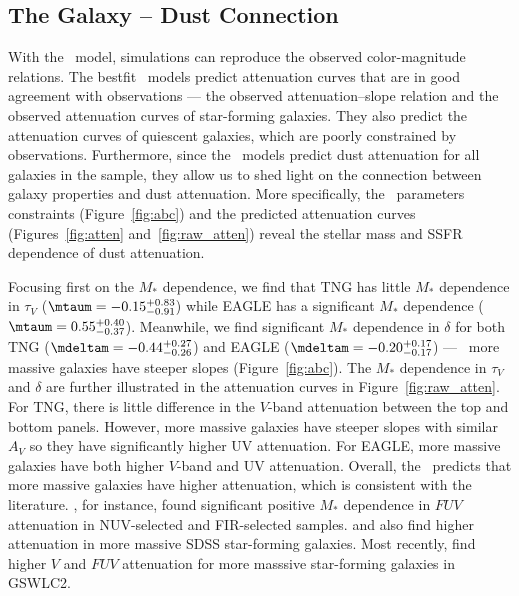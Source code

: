 \subsection{The Galaxy -- Dust Connection}  
With the \eda~model, simulations can reproduce the observed color-magnitude
relations. The bestfit \eda~models predict attenuation curves that are
in good agreement with observations --- the observed attenuation--slope
relation and the observed attenuation curves of star-forming galaxies. They
also predict the attenuation curves of quiescent galaxies, which are poorly
constrained by observations. Furthermore, since the \eda~models predict dust
attenuation for all galaxies in the sample, they allow us to shed light on the
connection between galaxy properties and dust attenuation.  More specifically, 
the \eda~parameters constraints (Figure~\ref{fig:abc}) and the predicted
attenuation curves (Figures~\ref{fig:atten} and~\ref{fig:raw_atten}) reveal the
stellar mass and SSFR dependence of dust attenuation. 

Focusing first on the $M_*$ dependence, we find that TNG has little $M_*$
dependence in $\tau_V$ ($\mtaum = -0.15\substack{+0.83 \\ -0.91}$) while EAGLE
has a significant $M_*$ dependence ($\mtaum = 0.55\substack{+0.40 \\ -0.37}$).
Meanwhile, we find significant $M_*$ dependence in $\delta$ for both TNG 
($\mdeltam = -0.44\substack{+0.27\\-0.26}$) and EAGLE ($\mdeltam =
-0.20\substack{+0.17\\-0.17}$) --- \ie~more massive galaxies have steeper
slopes (Figure~\ref{fig:abc}). The $M_*$ dependence in $\tau_V$ and $\delta$
are further illustrated in the attenuation curves in Figure~\ref{fig:raw_atten}.
For TNG, there is little difference in the $V$-band attenuation between the 
top and bottom panels. However, more massive galaxies have steeper slopes 
with similar $A_V$ so they have significantly higher UV attenuation. For
EAGLE, more massive galaxies have both higher $V$-band and UV attenuation.
Overall, the \eda~predicts that more massive galaxies have higher attenuation,
which is consistent with the literature. \cite{burgarella2005}, for instance,
found significant positive $M_*$ dependence in $FUV$ attenuation in
NUV-selected and FIR-selected samples. \cite{garn2010} and \cite{battisti2016}
also find higher attenuation in more massive SDSS star-forming galaxies. Most
recently, \cite{salim2018} find higher $V$ and $FUV$ attenuation for more
masssive star-forming galaxies in GSWLC2. 

